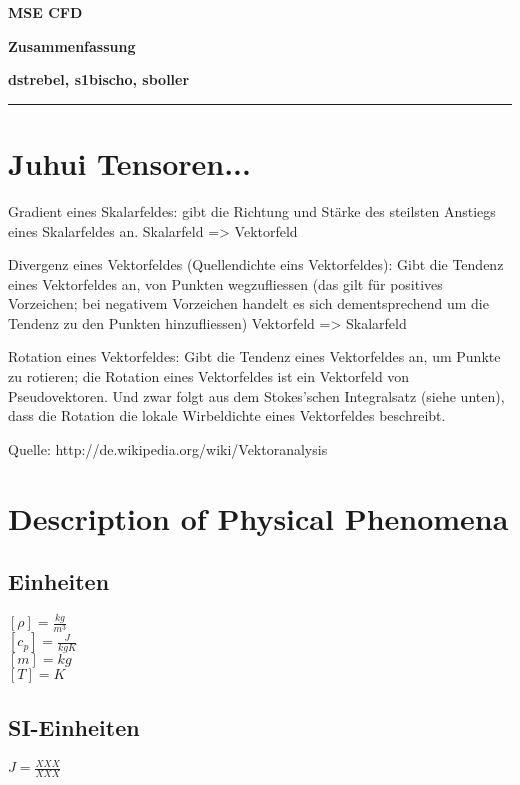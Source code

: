\documentclass[a4paper]{scrartcl}
\begin{document}
\pagestyle{fancy}
\setlength{\footskip}{10mm}
\fancyhf{}
\renewcommand{\headrulewidth}{0pt}
\renewcommand{\footrulewidth}{0.5pt}

 \centerline{\LARGE \bf \textsf{MSE CFD}} 
 \smallskip
\centerline{\Large \bf \textsf {Zusammenfassung}}
\medskip
  \centerline{\bf \textsf{dstrebel, s1bischo, sboller }}

 \smallskip \noindent\rule{\textwidth}{0.5pt}
\smallskip%



\section{Juhui Tensoren...}

Gradient eines Skalarfeldes: gibt die Richtung und Stärke des steilsten Anstiegs
eines Skalarfeldes an.
Skalarfeld => Vektorfeld

Divergenz eines Vektorfeldes (Quellendichte eins Vektorfeldes): Gibt die Tendenz
eines Vektorfeldes an, von Punkten wegzufliessen (das gilt für positives
Vorzeichen; bei negativem Vorzeichen handelt es sich dementsprechend um die
Tendenz zu den Punkten hinzufliessen) Vektorfeld => Skalarfeld

Rotation eines Vektorfeldes: Gibt die Tendenz eines Vektorfeldes an, um Punkte
zu rotieren; die Rotation eines Vektorfeldes ist ein Vektorfeld von
Pseudovektoren. Und zwar folgt aus dem Stokes’schen Integralsatz (siehe unten),
dass die Rotation die lokale Wirbeldichte eines Vektorfeldes beschreibt.

Quelle: http://de.wikipedia.org/wiki/Vektoranalysis



\section{Description of Physical Phenomena}
\subsection{Einheiten}

$ [\rho]=\frac{kg}{m^3} $\\
$ [c_p]=\frac{J}{kgK} $\\
$ [m]=kg $\\
$ [T]=K $\\

\subsection{SI-Einheiten}
$ J = \frac{XXX}{XXX} $\\
\end{document}
